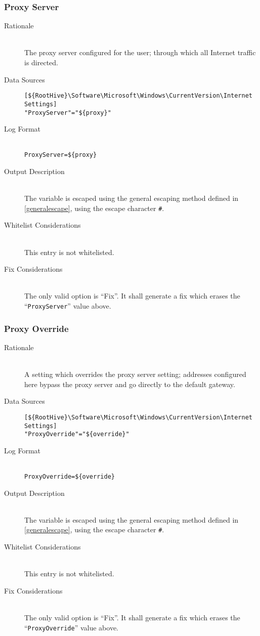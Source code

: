 \subsubsection{Proxy Server}
\begin{description}
\item[Rationale] \hfill \\
The proxy server configured for the user; through which all Internet traffic is
directed.
\item[Data Sources] \hfill
\vspace{-\baselineskip}
\begin{verbatim}
[${RootHive}\Software\Microsoft\Windows\CurrentVersion\Internet Settings]
"ProxyServer"="${proxy}"
\end{verbatim}
\item[Log Format] \hfill \\
\verb|ProxyServer=${proxy}|
\item[Output Description] \hfill \\
The variable  is escaped using the general escaping method defined in
\ref{generalescape}, using the escape character \verb|#|.
\item[Whitelist Considerations] \hfill \\
This entry is not whitelisted.
\item[Fix Considerations] \hfill \\
The only valid option is ``Fix''. It shall generate a fix which erases the
``\verb|ProxyServer|'' value above.
\end{description}

\subsubsection{Proxy Override}
\begin{description}
\item[Rationale] \hfill \\
A setting which overrides the proxy server setting; addresses configured here
bypass the proxy server and go directly to the default gateway.
\item[Data Sources] \hfill
\vspace{-\baselineskip}
\begin{verbatim}
[${RootHive}\Software\Microsoft\Windows\CurrentVersion\Internet Settings]
"ProxyOverride"="${override}"
\end{verbatim}
\item[Log Format] \hfill \\
\verb|ProxyOverride=${override}|
\item[Output Description] \hfill \\
The variable  is escaped using the general escaping method defined
in \ref{generalescape}, using the escape character \verb|#|.
\item[Whitelist Considerations] \hfill \\
This entry is not whitelisted.
\item[Fix Considerations] \hfill \\
The only valid option is ``Fix''. It shall generate a fix which erases the
``\verb|ProxyOverride|'' value above.
\end{description}

